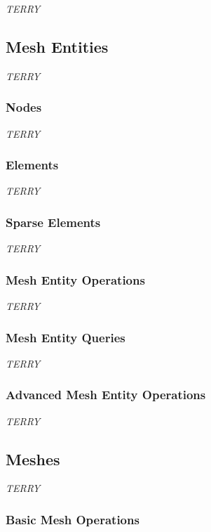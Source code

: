 {\it TERRY}

\subsection{Mesh Entities}
\label{sec:entities}

{\it TERRY}

\subsubsection{Nodes}
\label{sec:nodes}

{\it TERRY}

\subsubsection{Elements}
\label{sec:elements}

{\it TERRY}

\subsubsection{Sparse Elements}
\label{sec:sparse}

{\it TERRY}

\subsubsection{Mesh Entity Operations}

{\it TERRY}

\subsubsection{Mesh Entity Queries}

{\it TERRY}

\subsubsection{Advanced Mesh Entity Operations}

{\it TERRY}

\subsection{Meshes}
\label{sec:meshes}

{\it TERRY}

\subsubsection{Basic Mesh Operations}

